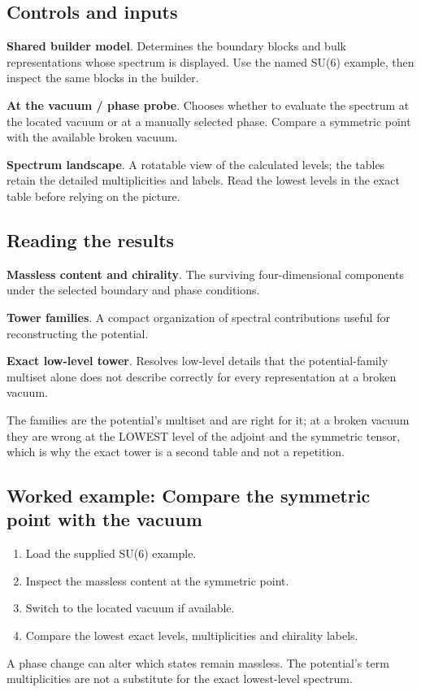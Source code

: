 \documentclass[11pt,a4paper]{article}
\begin{document}
\subsection*{Controls and inputs}
\textbf{Shared builder model}. Determines the boundary blocks and bulk representations whose spectrum is displayed. Use the named SU(6) example, then inspect the same blocks in the builder.

\textbf{At the vacuum / phase probe}. Chooses whether to evaluate the spectrum at the located vacuum or at a manually selected phase. Compare a symmetric point with the available broken vacuum.

\textbf{Spectrum landscape}. A rotatable view of the calculated levels; the tables retain the detailed multiplicities and labels. Read the lowest levels in the exact table before relying on the picture.

\subsection*{Reading the results}
\textbf{Massless content and chirality}. The surviving four-dimensional components under the selected boundary and phase conditions.

\textbf{Tower families}. A compact organization of spectral contributions useful for reconstructing the potential.

\textbf{Exact low-level tower}. Resolves low-level details that the potential-family multiset alone does not describe correctly for every representation at a broken vacuum.

The families are the potential's multiset and are right for it; at a broken vacuum they are wrong at the LOWEST level of the adjoint and the symmetric tensor, which is why the exact tower is a second table and not a repetition.
\subsection*{Worked example: Compare the symmetric point with the vacuum}
\begin{enumerate}
\item Load the supplied SU(6) example.
\item Inspect the massless content at the symmetric point.
\item Switch to the located vacuum if available.
\item Compare the lowest exact levels, multiplicities and chirality labels.
\end{enumerate}
A phase change can alter which states remain massless. The potential's term multiplicities are not a substitute for the exact lowest-level spectrum.
\end{document}
